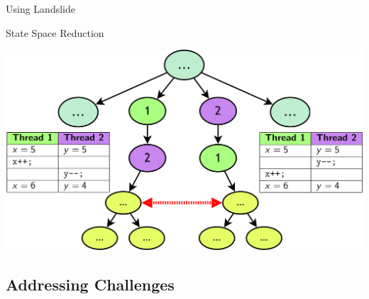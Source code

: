 \documentclass[xcolor=dvipsnames]{beamer}
\begin{document}
\begin{frame}{Using Landslide}
\end{frame}

\begin{frame}{State Space Reduction}
	\begin{center}
	\includegraphics[width=\textwidth]{undiamond1.png}
	\end{center}
\end{frame}

\subsection{Addressing Challenges} %
\end{document}

